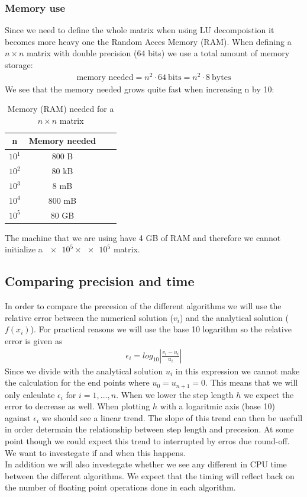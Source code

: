 \documentclass[american,a4paper,12pt]{article}
\begin{document}
\subsubsection*{Memory use}
Since we need to define the whole matrix when using LU decompoistion it becomes more heavy one the Random Acces Memory (RAM). When defining a $n \times n$ matrix with double precision (64 bits) we use a total amount of memory storage:
\begin{align*}
  \text{memory needed} = n^2 \cdot64 \ \text{bits} = n^2 \cdot 8 \ \text{bytes}
\end{align*}
We see that the memory needed grows quite fast when increasing n by 10:
\begin{table}[H]
  \begin{center}
  \caption{Memory (RAM) needed for a $n \times n$ matrix}
  \begin{tabular}{|c|c|c|c|} \hline
  \textbf{n} & \textbf{Memory needed} \\ \hline
  $10^1$ & 800 B \\ \hline
  $10^2$ & 80 kB \\ \hline
  $10^3$ & 8 mB \\ \hline
  $10^4$ & 800 mB \\ \hline
  $10^5$ & 80 GB \\ \hline
  \end{tabular}
  \end{center}
  \label{tab:RAM}
\end{table}
The machine that we are using have 4 GB of RAM and therefore we cannot initialize a $\num{e5} \times \num{e5}$ matrix.
\subsection{Comparing precision and time}
In order to compare the precesion of the different algorithms we will use the relative error between the numerical solution ($v_i$) and the analytical solution ($f(x_i)$). For practical reasons we will use the base 10 logarithm so the relative error is given as
\begin{align*}
  \epsilon_i = log_{10}\left|\frac{v_i - u_i}{u_i}\right|
\end{align*}
Since we divide with the analytical solution $u_i$ in this expression we cannot make the calculation for the end points where $u_0 = u_{n+1} = 0$. This means that we will only calculate $\epsilon_i$ for $i = 1, \hdots, n$. When we lower the step length $h$ we expect the error to decrease as well. When plotting $h$ with a logaritmic axis (base 10) against $\epsilon_i$ we should see a linear trend. The slope of this trend can then be usefull in order determain the relationship between step length and precesion. At some point though we could expect this trend to interrupted by erros due round-off. We want to investegate if and when this happens.\\
In addition we will also investegate whether we see any different in CPU time between the different algorithms. We expect that the timing will reflect back on the number of floating point operations done in each algorithm.
\end{document}
